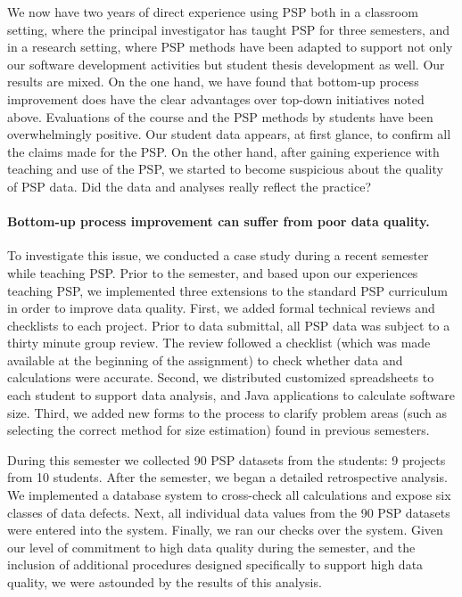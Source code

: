 We now have two years of direct experience using PSP both in a classroom
setting, where the principal investigator has taught PSP for three
semesters, and in a research setting, where PSP methods have been 
adapted to 
support not only our software development activities but student thesis
development as well.  Our results are mixed.  On the one hand, we
have found that bottom-up process improvement does have the clear advantages over
top-down initiatives noted above.  Evaluations of the course and the PSP
methods by students have been overwhelmingly positive. Our student data
appears, at first glance, to confirm all the claims made for the PSP.  On
the other hand, after gaining experience with teaching and use of the PSP,
we started to become suspicious about the quality of PSP data.
Did the data and analyses really reflect the practice?


\paragraph{Bottom-up process improvement can suffer from poor data quality.} 

To investigate this issue, we conducted a case study during a recent
semester while teaching PSP. Prior to the semester, and based upon our
experiences teaching PSP, we implemented three extensions to the standard PSP
curriculum in order to improve data quality. First, we added formal
technical reviews and checklists to each project. Prior to data submittal,
all PSP data was subject to a thirty minute group review. The
review followed a checklist (which was made available at the beginning of
the assignment) to check whether data and calculations were accurate.
Second, we distributed customized spreadsheets to each student to support
data analysis, and Java applications to calculate software size. Third, we 
added new forms to the process to clarify problem areas (such as selecting
the correct method for size estimation) found in previous semesters. 

During this semester we collected 90 PSP datasets from the students: 9
projects from 10 students. After the semester, we began a detailed
retrospective analysis. We implemented a database system to cross-check all
calculations and expose six classes of data defects. Next, all individual
data values from the 90 PSP datasets were entered into the system. Finally,
we ran our checks over the system.  Given our level of commitment to high
data quality during the semester, and the inclusion of additional
procedures designed specifically to support high data quality, we were
astounded by the results of this analysis.

